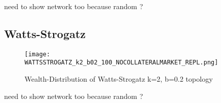 \documentclass[Bachelorarbeit.tex]{subfiles}
\begin{document}
need to show network too because random ?

\subsection{Watts-Strogatz}
\begin{figure}[H]
	\centering
  \texttt{[image: WATTSSTROGATZ\_k2\_b02\_100\_NOCOLLATERALMARKET\_REPL.png]}
	\caption{Wealth-Distribution of Watts-Strogatz k=2, b=0.2 topology}
	\label{fig1}
\end{figure}

need to show network too because random ?
\end{document}
